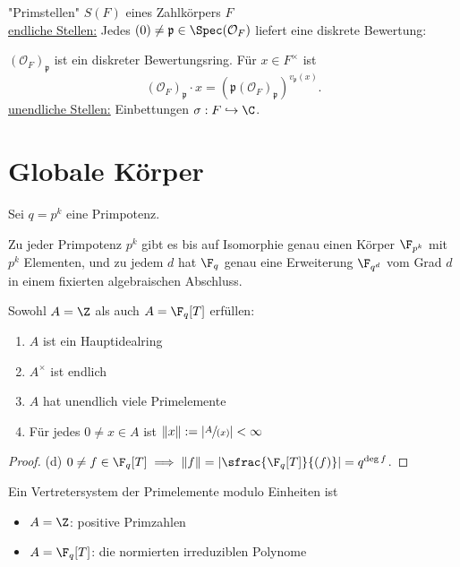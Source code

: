 \begin{bemerkungnr}
    "Primstellen" $S(F)$ eines Zahlkörpers $F$\\
    \underline{endliche Stellen:} Jedes $(0) \ne \mathfrak{p} \in \Spec(\mathcal{O}_F)$ liefert eine diskrete Bewertung:

    $(\mathcal{O}_F)_\mathfrak{p}$ ist ein diskreter Bewertungsring. Für $x \in F^\times$ ist 
    $$ (\mathcal{O}_F)_\mathfrak{p}\cdot x = (\mathfrak{p}(\mathcal{O}_F)_\mathfrak{p})^{v_\mathfrak{p}(x)}.$$
    \underline{unendliche Stellen:} Einbettungen $\sigma: F \hookrightarrow \C$.
\end{bemerkungnr}

\section{Globale Körper}
Sei $q = p^k$ eine Primpotenz.

\begin{erinnerungnr}
    Zu jeder Primpotenz $p^k$ gibt es bis auf Isomorphie genau einen Körper $\F_{p^k}$ mit $p^k$ Elementen, und zu jedem $d$ hat
    $\F_q$ genau eine Erweiterung $\F_{q^d}$ vom Grad $d$ in einem fixierten algebraischen Abschluss.
\end{erinnerungnr}

\begin{satz}
    Sowohl $A = \Z$ als auch $A = \F_q[T]$ erfüllen:
    \begin{enumerate}[label=(\alph*)]
        \item $A$ ist ein Hauptidealring
        \item $A^\times$ ist endlich
        \item $A$ hat unendlich viele Primelemente 
        \item Für jedes $0 \ne x \in A$ ist $\|x\|:= |\sfrac{A}{(x)}| < \infty$ 
    \end{enumerate}
\end{satz}
\begin{proof}
    (d) $0 \ne f \in \F_q[T] \implies \|f\| = | \sfrac{\F_q[T]}{(f)} | = q^{\deg f}$.
\end{proof}
\begin{bemerkungnr}
    Ein Vertretersystem der Primelemente modulo Einheiten ist
    \begin{itemize}
        \item $A = \Z$: positive Primzahlen
        \item $A = \F_q[T]$: die normierten irreduziblen Polynome
    \end{itemize}
\end{bemerkungnr}

